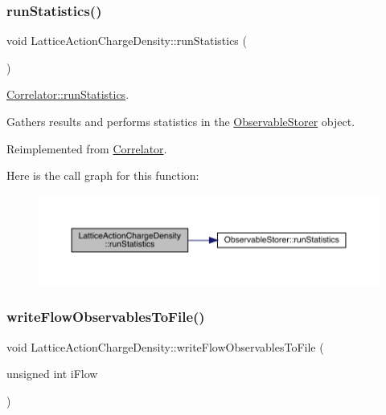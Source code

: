 \subsubsection{\texorpdfstring{runStatistics()}{runStatistics()}}
{\footnotesize\ttfamily void Lattice\+Action\+Charge\+Density\+::run\+Statistics (\begin{DoxyParamCaption}{ }\end{DoxyParamCaption})\hspace{0.3cm}{\ttfamily [virtual]}}



\mbox{\hyperlink{class_correlator_a35197b1d12b62ef30b79c0138a26456e}{Correlator\+::run\+Statistics}}. 

Gathers results and performs statistics in the \mbox{\hyperlink{class_observable_storer}{Observable\+Storer}} object. 

Reimplemented from \mbox{\hyperlink{class_correlator_a35197b1d12b62ef30b79c0138a26456e}{Correlator}}.

Here is the call graph for this function\+:
\nopagebreak
\begin{figure}[H]
\begin{center}
\leavevmode
\includegraphics[width=350pt]{class_lattice_action_charge_density_a21d608703811d2814e7f654588eaa0c0_cgraph}
\end{center}
\end{figure}
\mbox{\label{class_lattice_action_charge_density_a54226556dc1497c311e4a4d50bf44c26}} 
\subsubsection{\texorpdfstring{writeFlowObservablesToFile()}{writeFlowObservablesToFile()}}
{\footnotesize\ttfamily void Lattice\+Action\+Charge\+Density\+::write\+Flow\+Observables\+To\+File (\begin{DoxyParamCaption}\item[{unsigned int}]{i\+Flow }\end{DoxyParamCaption})\hspace{0.3cm}{\ttfamily [virtual]}}



